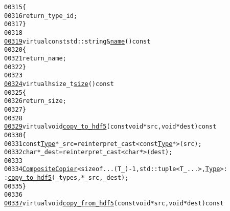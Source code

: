 \begin{footnotesize}
\begin{alltt}
00315 \textcolor{keyword}{                }\{
00316                     \textcolor{keywordflow}{return} \_type\_id;
00317                 \}
00318 
\hypertarget{hdf5_8hh_source_l00319}{}\hyperlink{classeos_1_1hdf5_1_1Composite_aa72cd90613270fa5006319bee231be5b}{00319}                 \textcolor{keyword}{virtual} \textcolor{keyword}{const} std::string & \hyperlink{classeos_1_1hdf5_1_1Composite_aa72cd90613270fa5006319bee231be5b}{name}()\textcolor{keyword}{ const}
00320 \textcolor{keyword}{                }\{
00321                     \textcolor{keywordflow}{return} \_name;
00322                 \}
00323 
\hypertarget{hdf5_8hh_source_l00324}{}\hyperlink{classeos_1_1hdf5_1_1Composite_a67ce4870971aced7cf83a7a88c16c61d}{00324}                 \textcolor{keyword}{virtual} hsize\_t \hyperlink{classeos_1_1hdf5_1_1Composite_a67ce4870971aced7cf83a7a88c16c61d}{size}()\textcolor{keyword}{ const}
00325 \textcolor{keyword}{                }\{
00326                     \textcolor{keywordflow}{return} \_size;
00327                 \}
00328 
\hypertarget{hdf5_8hh_source_l00329}{}\hyperlink{classeos_1_1hdf5_1_1Composite_ac86859046bcb7b5741afdb5ec13e78f0}{00329}                 \textcolor{keyword}{virtual} \textcolor{keywordtype}{void} \hyperlink{classeos_1_1hdf5_1_1Composite_ac86859046bcb7b5741afdb5ec13e78f0}{copy_to_hdf5}(\textcolor{keyword}{const} \textcolor{keywordtype}{void} * src, \textcolor{keywordtype}{void} * dest)\textcolor{keyword}{ const}
00330 \textcolor{keyword}{                }\{
00331                     \textcolor{keyword}{const} \hyperlink{structeos_1_1hdf5_1_1Type}{Type} * \_src = \textcolor{keyword}{reinterpret\_cast<}\textcolor{keyword}{const }\hyperlink{structeos_1_1hdf5_1_1Type}{Type} *\textcolor{keyword}{>}(src);
00332                     \textcolor{keywordtype}{char} * \_dest = \textcolor{keyword}{reinterpret\_cast<}\textcolor{keywordtype}{char} *\textcolor{keyword}{>}(dest);
00333 
00334                     \hyperlink{structeos_1_1hdf5_1_1CompositeCopier}{CompositeCopier}<\textcolor{keyword}{sizeof}...(T\_) - 1, std::tuple<T\_ ...>, \hyperlink{structeos_1_1hdf5_1_1Type}{Type}>:
      :\hyperlink{classeos_1_1hdf5_1_1Composite_ac86859046bcb7b5741afdb5ec13e78f0}{copy_to_hdf5}(\_types, *\_src, \_dest);
00335                 \}
00336 
\hypertarget{hdf5_8hh_source_l00337}{}\hyperlink{classeos_1_1hdf5_1_1Composite_a4504f18af7ad323f89b4635eae9f1695}{00337}                 \textcolor{keyword}{virtual} \textcolor{keywordtype}{void} \hyperlink{classeos_1_1hdf5_1_1Composite_a4504f18af7ad323f89b4635eae9f1695}{copy_from_hdf5}(\textcolor{keyword}{const} \textcolor{keywordtype}{void} * src, \textcolor{keywordtype}{void} * dest)\textcolor{keyword}{ const}

\end{alltt}
\end{footnotesize}
